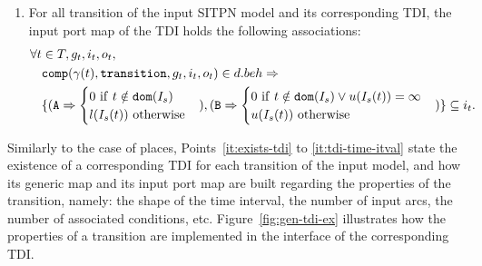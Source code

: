 \begin{definition}
\begin{enumerate}[resume]
  \item\label{it:tdi-time-itval} For all transition of the input SITPN
    model and its corresponding TDI, the input port map of the TDI
    holds the following associations:
    \begin{equation*}
      \begin{aligned}[t]
        \forall{}t&\in{}T,g_t,i_t,o_t, \\
                  & \mathtt{comp}(\gamma(t),\mathtt{transition},g_t,i_t,o_t)\in{}d.beh\Rightarrow \\
                  & \{(\mathtt{A}\Rightarrow\begin{cases}
                                              0~\mathrm{if}~t\notin\mathtt{dom}(I_s) \\
                                              l(I_s(t))~\mathrm{otherwise} \\
                                            \end{cases}),
        (\mathtt{B}\Rightarrow\begin{cases}
                                0~\mathrm{if}~t\notin\mathtt{dom}(I_s)\lor{}u(I_s(t))=\infty \\
                                u(I_s(t))~\mathrm{otherwise} \\
                              \end{cases})\}\subseteq{}i_t. \\
      \end{aligned}
    \end{equation*}

  \end{enumerate}

  \bigskip

  Similarly to the case of places, Points~\ref{it:exists-tdi} to
  \ref{it:tdi-time-itval} state the existence of a corresponding TDI
  for each transition of the input model, and how its generic map and
  its input port map are built regarding the properties of the
  transition, namely: the shape of the time interval, the number of
  input arcs, the number of associated conditions,
  etc. Figure~\ref{fig:gen-tdi-ex} illustrates how the properties of a
  transition are implemented in the interface of the corresponding
  TDI.


\end{definition}
